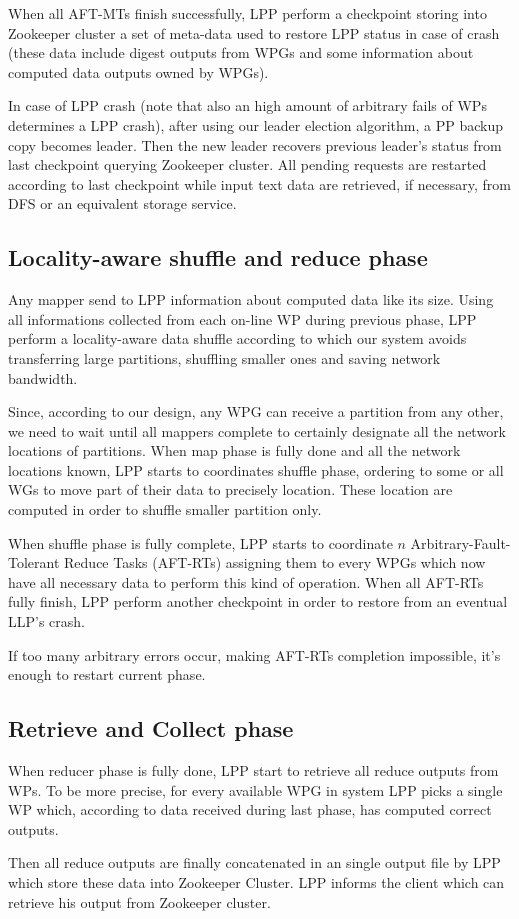 \documentclass[sigchi]{acmart}
\begin{document}
When all AFT-MTs finish successfully, LPP perform a checkpoint storing into Zookeeper cluster a set of meta-data used to restore LPP status in case of crash (these data include digest outputs from WPGs and some information about computed data outputs owned by WPGs). 

In case of LPP crash (note that also an high amount of arbitrary fails of WPs determines a LPP crash), after using our leader election algorithm, a PP backup copy becomes leader. Then the new leader recovers previous leader's status from last checkpoint querying Zookeeper cluster. All pending requests are restarted according to last checkpoint while input text data are retrieved, if necessary, from DFS or an equivalent storage service. 

\subsection{Locality-aware shuffle and reduce phase}

Any mapper send to LPP information about computed data like its size. Using all informations collected from each on-line WP during previous phase, LPP perform a locality-aware data shuffle according to which our system avoids transferring large partitions, shuffling smaller ones and saving network bandwidth.

Since, according to our design, any WPG can receive a partition from any other, we need to wait until all mappers complete to certainly designate all the network locations of partitions. When map phase is fully done and all the network locations known, LPP starts to coordinates shuffle phase, ordering to some or all WGs to move part of their data to precisely location. These location are computed in order to shuffle smaller partition only. 

When shuffle phase is fully complete, LPP starts to coordinate $n$ Arbitrary-Fault-Tolerant Reduce Tasks (AFT-RTs) assigning them to every WPGs which now have all necessary data to perform this kind of operation. When all AFT-RTs fully finish, LPP perform another checkpoint in order to restore from an eventual LLP's crash.

If too many arbitrary errors occur, making AFT-RTs completion impossible, it's enough to restart current phase.

\subsection{Retrieve and Collect phase}

When reducer phase is fully done, LPP start to retrieve all reduce outputs from WPs. To be more precise, for every available WPG in system LPP picks a single WP which, according to data received during last phase, has computed correct outputs.

Then all reduce outputs are finally concatenated in an single output file by LPP which store these data into Zookeeper Cluster. LPP informs the client which can retrieve his output from Zookeeper cluster.




\appendix
\end{document}
